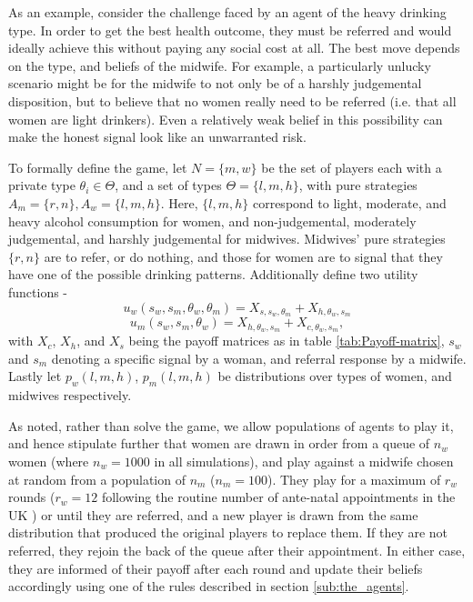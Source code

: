 \documentclass[graybox]{svmult}
\begin{document}
As an example, consider the challenge faced by an agent of the heavy drinking type. In order to get the best health outcome, they must be referred and would ideally achieve this without paying any social cost at all. The best move depends on the type, and beliefs of the midwife. For example, a particularly unlucky scenario might be for the midwife to not only be of a harshly judgemental disposition, but to believe that no women really need to be referred (i.e. that all women are light drinkers). Even a relatively weak belief in this possibility can make the honest signal look like an unwarranted risk.


To formally define the game, let \(N = \{m, w\}\) be the set of players each with a private type \(\theta_{i} \in \Theta\), and a set of types \(\Theta=\{l, m, h\}\), with pure strategies \(A_{m}=\{r,n\}, A_{w}=\{l, m, h\}\). Here, \(\{l, m, h\}\) correspond to light, moderate, and heavy alcohol consumption for women, and non-judgemental, moderately judgemental, and harshly judgemental for midwives. Midwives' pure strategies \(\{r,n\}\) are to refer, or do nothing, and those for women are to signal that they have one of the possible drinking patterns.
Additionally define two utility functions - 
\begin{equation}
u_{w}(s_{w}, s_{m}, \theta_{w}, \theta_{m})=X_{s, s_{w}, \theta_{m}} + X_{h, \theta_{w}, s_{m}}
\end{equation} 
\begin{equation}
u_{m}(s_{w}, s_{m}, \theta_{w})=X_{h, \theta_{w}, s_{m}} + X_{c, \theta_{w}, s_{m}},
\end{equation} with $X_{c}$, $X_{h}$, and $X_{s}$ being the payoff matrices as in table \ref{tab:Payoff-matrix}, $s_{w}$ and $s_{m}$ denoting a specific signal by a woman, and referral response by a midwife. Lastly let \(p_{w}(l, m, h)\), \(p_{m}(l, m, h)\) be distributions over types of women, and midwives respectively.


As noted, rather than solve the game, we allow populations of agents to play it, and hence stipulate further that women are drawn in order from a queue of \(n_{w}\) women (where \(n_{w}=1000\) in all simulations), and play against a midwife chosen at random from a population of \(n_{m}\) (\(n_{m}=100\)). They play for a maximum of \(r_{w}\) rounds (\(r_{w}=12\) following the routine number of ante-natal appointments in the UK \citep{NICE2010a}) or until they are referred, and a new player is drawn from the same distribution that produced the original players to replace them. If they are not referred, they rejoin the back of the queue after their appointment. In either case, they are informed of their payoff after each round and update their beliefs accordingly using one of the rules described in section \ref{sub:the_agents}.
\end{document}
